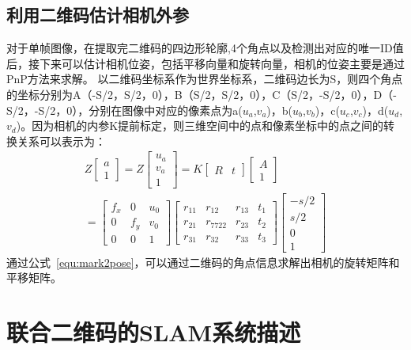\subsection{利用二维码估计相机外参}
\label{sec:2.2.3}
对于单帧图像，在提取完二维码的四边形轮廓,4个角点以及检测出对应的唯一ID值后，接下来可以估计相机位姿，包括平移向量和旋转向量，相机的位姿主要是通过PnP方法来求解。
以二维码坐标系作为世界坐标系，二维码边长为S，则四个角点的坐标分别为A（-S/2，S/2，0），B（S/2，S/2，0），C（S/2，-S/2，0），D（-S/2，-S/2，0），分别在图像中对应的像素点为a($u_a$,$v_a$)，b($u_b$,$v_b$)，c($u_c$,$v_c$)，d($u_d$,$v_d$)。因为相机的内参K提前标定，则三维空间中的点和像素坐标中的点之间的转换关系可以表示为：
\begin{equation}
\begin{split}
  Z{\left[ \begin{array}{ccc}a\\1\end{array} \right ]}=Z{\left[ \begin{array}{ccc}u_a\\v_a\\1\end{array} \right ]}=K{\left[ \begin{array}{ccc}R&t\end{array} \right ]}{\left[ \begin{array}{ccc}A\\1\end{array} \right ]} \\
  ={\left[ \begin{array}{ccc}f_x & 0 & u_0\\0 & f_y &v_0 \\0 & 0 & 1\end{array} \right ]}{\left[ \begin{array}{cccc}r_{11}&r_{12}&r_{13}&t_1\\r_{21}&r_{7722}&r_{23}&t_2\\r_{31}&r_{32}&r_{33}&t_3\end{array} \right ]}{\left[ \begin{array}{ccc} -s/2\\s/2\\0\\1 \end{array} \right ]}
\end{split}
\label{equ:mark2pose}
\end{equation}
通过公式~\ref{equ:mark2pose}，可以通过二维码的角点信息求解出相机的旋转矩阵和平移矩阵。
\section{联合二维码的SLAM系统描述}
